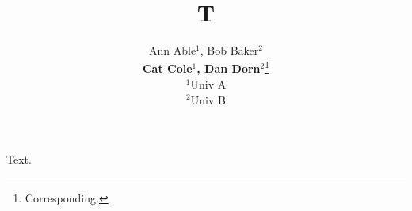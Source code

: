 \documentclass{article}
\title{T}
\author{Ann Able$^1$, Bob Baker$^2$\\ \textbf{Cat Cole$^1$, Dan Dorn$^2$}\thanks{Corresponding.}\\ $^1$Univ A\\ $^2$Univ B}
\begin{document}
\maketitle
Text.
\end{document}
